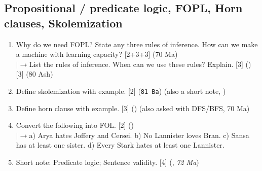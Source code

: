 \documentclass[12pt]{article}
\newcommand{\lb}{\\$\left|\rightarrow\right.$}
\begin{document}
  \subsection{Propositional / predicate logic, FOPL, Horn clauses, Skolemization}
    \begin{enumerate}[topsep=0pt, noitemsep]
      \item Why do we need FOPL? State any three rules of inference. How can we make a machine with learning capacity? \hfill [2+3+3] (70 Ma)
        \lb List the rules of inference. When can we use these rules? Explain. \hfill [3] () [3] (80 Ash)

      \item Define skolemization with example. \hfill [2] (\texttt{81 Ba}) \quad (also a short note, )

      \item Define horn clause with example. \hfill [3] () \quad (also asked with DFS/BFS, 70 Ma)

      \item Convert the following into FOL. \hfill [2] ()
        \lb a) Arya hates Joffery and Cersei. b) No Lannister loves Bran. c) Sansa has at least one sister. d) Every Stark hates at least one Lannister.

      \item Short note: Predicate logic; Sentence validity. \hfill [4] (, \textit{72 Ma})
    \end{enumerate}
\end{document}
